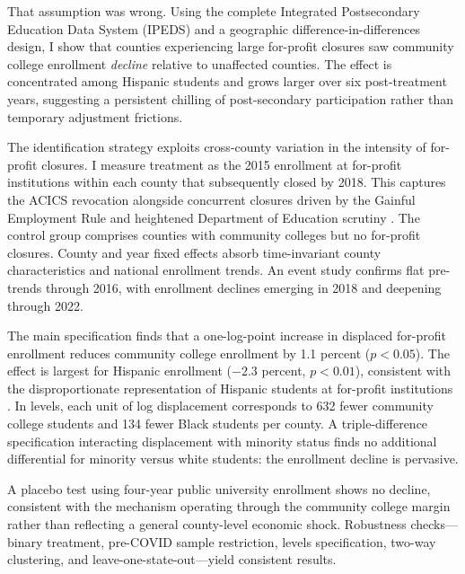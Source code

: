 \documentclass[12pt]{article}
\begin{document}
That assumption was wrong. Using the complete Integrated Postsecondary Education Data System (IPEDS) and a geographic difference-in-differences design, I show that counties experiencing large for-profit closures saw community college enrollment \textit{decline} relative to unaffected counties. The effect is concentrated among Hispanic students and grows larger over six post-treatment years, suggesting a persistent chilling of post-secondary participation rather than temporary adjustment frictions.

The identification strategy exploits cross-county variation in the intensity of for-profit closures. I measure treatment as the 2015 enrollment at for-profit institutions within each county that subsequently closed by 2018. This captures the ACICS revocation alongside concurrent closures driven by the Gainful Employment Rule and heightened Department of Education scrutiny \citep{Cellini2020,Looney2015}. The control group comprises counties with community colleges but no for-profit closures. County and year fixed effects absorb time-invariant county characteristics and national enrollment trends. An event study confirms flat pre-trends through 2016, with enrollment declines emerging in 2018 and deepening through 2022.

The main specification finds that a one-log-point increase in displaced for-profit enrollment reduces community college enrollment by 1.1 percent ($p < 0.05$). The effect is largest for Hispanic enrollment ($-2.3$ percent, $p < 0.01$), consistent with the disproportionate representation of Hispanic students at for-profit institutions \citep{Iloh2016}. In levels, each unit of log displacement corresponds to 632 fewer community college students and 134 fewer Black students per county. A triple-difference specification interacting displacement with minority status finds no additional differential for minority versus white students: the enrollment decline is pervasive.

A placebo test using four-year public university enrollment shows no decline, consistent with the mechanism operating through the community college margin rather than reflecting a general county-level economic shock. Robustness checks---binary treatment, pre-COVID sample restriction, levels specification, two-way clustering, and leave-one-state-out---yield consistent results.
\end{document}
